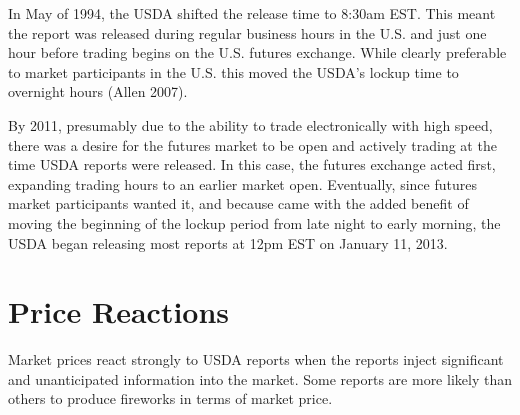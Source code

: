 \documentclass[
  letterpaper,
  DIV=11,
  numbers=noendperiod]{scrreprt}
\begin{document}
In May of 1994, the USDA shifted the release time to 8:30am EST. This
meant the report was released during regular business hours in the U.S.
and just one hour before trading begins on the U.S. futures exchange.
While clearly preferable to market participants in the U.S. this moved
the USDA's lockup time to overnight hours (Allen 2007).

By 2011, presumably due to the ability to trade electronically with high
speed, there was a desire for the futures market to be open and actively
trading at the time USDA reports were released. In this case, the
futures exchange acted first, expanding trading hours to an earlier
market open. Eventually, since futures market participants wanted it,
and because came with the added benefit of moving the beginning of the
lockup period from late night to early morning, the USDA began releasing
most reports at 12pm EST on January 11, 2013.

\hypertarget{price-reactions-1}{%
\section{Price Reactions}\label{price-reactions-1}}

Market prices react strongly to USDA reports when the reports inject
significant and unanticipated information into the market. Some reports
are more likely than others to produce fireworks in terms of market
price.
\end{document}
